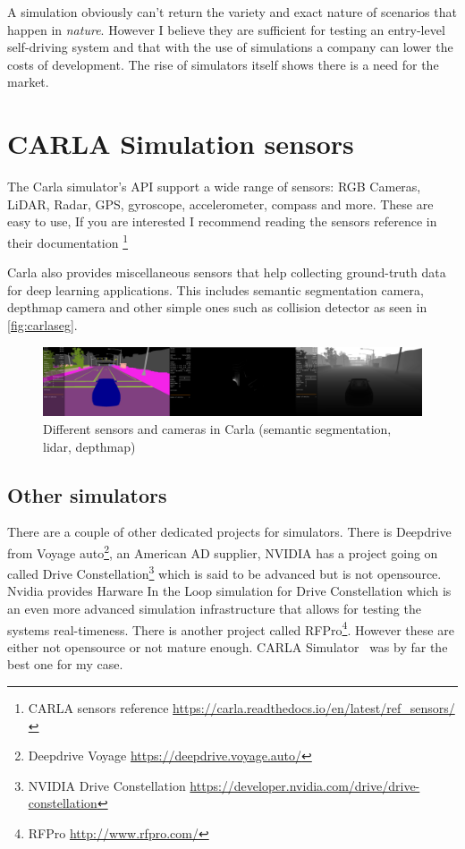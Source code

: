 A simulation obviously can't return the variety and exact nature of scenarios
that happen in \emph{nature}. However I believe they are sufficient for testing
an entry-level self-driving system and that with the use of simulations a
company can lower the costs of development. The rise of simulators itself shows
there is a need for the market.

\section{CARLA Simulation sensors}

The Carla simulator's API support a wide range of sensors: RGB Cameras, LiDAR,
Radar, GPS, gyroscope, accelerometer, compass and more. These are easy to
use, If you are interested I recommend reading the sensors reference in their
documentation \footnote{CARLA sensors reference
\url{https://carla.readthedocs.io/en/latest/ref_sensors/}}

Carla also provides miscellaneous sensors that help collecting ground-truth data
for deep learning applications. This includes semantic segmentation camera,
depthmap camera and other simple ones such as collision detector as seen in \autoref{fig:carlaseg}.

\begin{figure}[!ht]
  \centering
  \includegraphics[width=150mm, keepaspectratio]{figures/carlaseg.png}
  \caption{Different sensors and cameras in Carla (semantic segmentation, lidar, depthmap)}
  \label{fig:carlaseg}
\end{figure}

\subsection{Other simulators}

There are a couple of other dedicated projects for simulators. There is
Deepdrive from Voyage auto\footnote{Deepdrive Voyage
\url{https://deepdrive.voyage.auto/}}, an American AD supplier, NVIDIA has a
project going on called Drive Constellation\footnote{NVIDIA Drive Constellation
\url{https://developer.nvidia.com/drive/drive-constellation}} which is said to
be advanced but is not opensource. Nvidia provides Harware In the Loop
simulation for Drive Constellation which is an even more advanced simulation
infrastructure that allows for testing the systems real-timeness. There is
another project called RFPro\footnote{RFPro \url{http://www.rfpro.com/}}.
However these are either not opensource or not mature enough. CARLA
Simulator~\cite{Dosovitskiy17} was by far the best one
for my case.